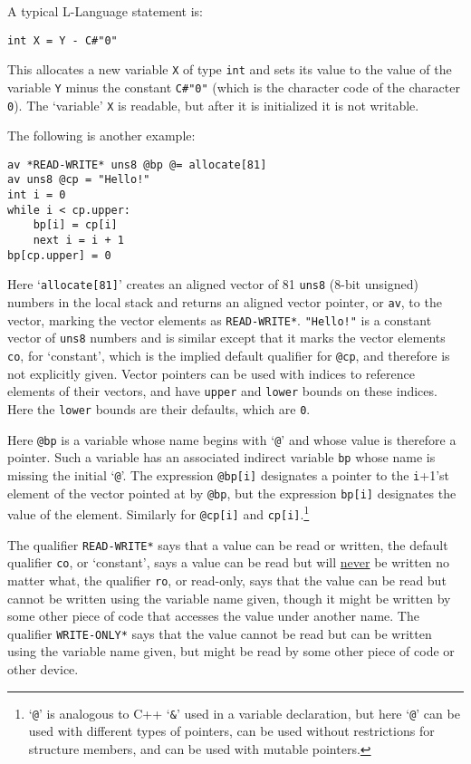 \documentclass[12pt]{article}
\newenvironment{indpar}[1][0.3in]%
	{\begin{list}{}%
		     {\setlength{\itemsep}{0in}%
		      \setlength{\topsep}{0in}%
		      \setlength{\parsep}{1ex}%
		      \setlength{\labelwidth}{#1}%
		      \setlength{\leftmargin}{#1}%
		      \addtolength{\leftmargin}{\labelsep}}%
	 \item}%
	{\end{list}}
\begin{document}
A typical L-Language statement is:
\begin{indpar}\begin{verbatim}
int X = Y - C#"0"
\end{verbatim}\end{indpar}
This allocates a new variable {\tt X} of type {\tt int}
and sets its value to the value of the
variable {\tt Y} minus the constant {\tt C\#"0"} (which is
the character code of the character {\tt 0}).
The `variable' {\tt X} is readable, but after it is
initialized it is not writable.

The following is another example:
\begin{indpar}\begin{verbatim}
av *READ-WRITE* uns8 @bp @= allocate[81]
av uns8 @cp = "Hello!"
int i = 0
while i < cp.upper:
    bp[i] = cp[i]
    next i = i + 1
bp[cp.upper] = 0
\end{verbatim}\end{indpar}

Here `{\tt allocate[81]}' creates an aligned vector of
81 {\tt uns8} (8-bit unsigned) numbers in the local stack
and returns an aligned vector pointer, or {\tt av}, to
the vector, marking the vector elements as {\tt *READ-WRITE*}.
{\tt "Hello!"} is a constant vector of {\tt uns8} numbers
and is similar except that it marks the vector elements
{\tt co}, for `constant', which is the implied default qualifier
for {\tt @cp}, and therefore
is not explicitly given.
Vector pointers can be used with indices
to reference elements of their vectors, and have {\tt upper} and
{\tt lower} bounds on these indices.  Here the {\tt lower} bounds
are their defaults, which are {\tt 0}.

Here {\tt @bp} is a variable whose name begins with `{\tt @}' and
whose value is therefore a pointer.  Such a variable has an associated
indirect variable {\tt bp} whose name is missing the initial `{\tt @}'.
The expression {\tt @bp[i]} designates a pointer to the {\tt i}+1'st
element of the vector pointed at by {\tt @bp}, but the expression
{\tt bp[i]} designates the value of the element.  Similarly for
{\tt @cp[i]} and {\tt cp[i]}.\footnote{`{\tt @}' is analogous to
C++ `{\tt \&}' used in a variable declaration, but here `{\tt @}'
can be used with different types of pointers, can be used
without restrictions for structure members, and can be used
with mutable pointers.}

The qualifier {\tt *READ-WRITE*} says that a value can be read or written,
the default qualifier {\tt co}, or `constant',
says a value can be read but will \underline{never} be written no matter what,
the qualifier {\tt ro}, or read-only, says that
the value can be read but
cannot be written using the variable name given, though it might be
written by some other piece of code that accesses the value under another
name.  The qualifier {\tt *WRITE-ONLY*} says that the value cannot be
read but can be written using the variable name given,
but might be read by some other piece of code or other device.
\end{document}
